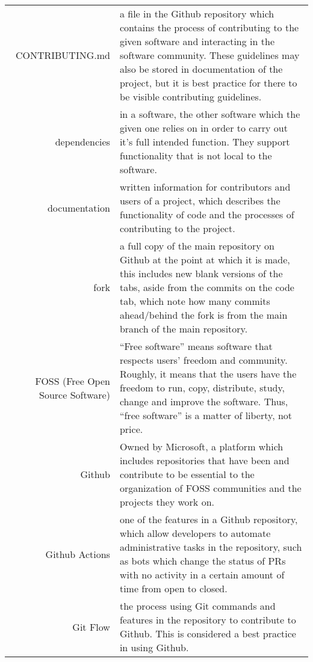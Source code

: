 \begin{center}
\begin{longtable}{r p{}}

CONTRIBUTING.md & a file in the Github repository which contains the process of contributing to the given software and interacting in the software community. These guidelines may also be stored in documentation of the project, but it is best practice for there to be visible contributing guidelines. \\

dependencies & in a software, the other software which the given one relies on in order to carry out it's full intended function. They support functionality that is not local to the software.  \\

documentation & written information for contributors and users of a project, which describes the functionality of code and the processes of contributing to the project. \\

fork & a full copy of the main repository on Github at the point at which it is made, this includes new blank versions of the tabs, aside from the commits on the code tab, which note how many commits ahead/behind the fork is from the main branch of the main repository. \\

FOSS (Free Open Source Software) \cite{gnuphilosophy} & “Free software” means software that respects users' freedom and community. Roughly, it means that the users have the freedom to run, copy, distribute, study, change and improve the software. Thus, “free software” is a matter of liberty, not price. \\

Github & Owned by Microsoft, a platform which includes repositories that have been and contribute to be essential to the organization of FOSS communities and the projects they work on. \\

Github Actions & one of the features in a Github repository, which allow developers to automate administrative tasks in the repository, such as bots which change the status of PRs with no activity in a certain amount of time from open to closed. \cite{pandasrepo} \\

Git Flow & the process using Git commands and features in the repository to contribute to Github. This is considered a best practice in using Github. \\


\end{longtable}
\end{center}
